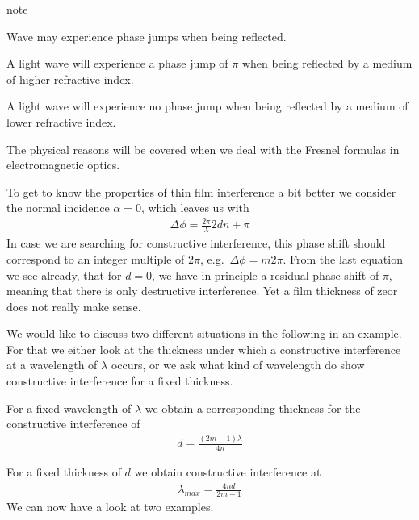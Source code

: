 \documentclass[letterpaper,10pt,english]{sphinxmanual}
\begin{document}
\begin{sphinxadmonition}{note}{}\unskip
{}

Wave may experience phase jumps when being reflected.

A light wave will experience a phase jump of \(\pi\) when being reflected by a medium of higher refractive index.

A light wave will experience no phase jump when being reflected by a medium of lower refractive index.

The physical reasons will be covered when we deal with the Fresnel formulas in electromagnetic optics.
\end{sphinxadmonition}

To get to know the properties of thin film interference a bit better we consider the normal incidence \(\alpha=0\), which leaves us with
\begin{equation*}
\begin{split}\Delta \phi=\frac{2\pi}{\lambda}2dn+\pi\end{split}
\end{equation*}
In case we are searching for constructive interference, this phase shift should correspond to an integer multiple of \(2\pi\), e.g. \(\Delta \phi =m2\pi\). From the last equation we see already, that for \(d=0\), we have in principle a residual phase shift of \(\pi\), meaning that there is only destructive interference. Yet a film thickness of zeor does not really make sense.

We would like to discuss two different situations in the following in an example. For that we either look at the thickness under which a constructive interference at a wavelength of \(\lambda\) occurs, or we ask what kind of wavelength do show constructive interference for a fixed thickness.


For a fixed wavelength of \(\lambda\) we obtain a corresponding thickness for the constructive interference of
\begin{equation*}
\begin{split}d=\frac{(2m-1)\lambda}{4n}\end{split}
\end{equation*}

For a fixed thickness of \(d\) we obtain constructive interference at
\begin{equation*}
\begin{split}\lambda_{max}=\frac{4nd}{2m-1}\end{split}
\end{equation*}
We can now have a look at two examples.
\end{document}
